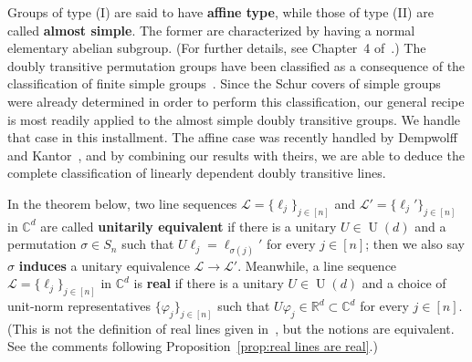 Groups of type (I) are said to have \textbf{affine type}, while those of type (II) are called \textbf{almost simple}.
The former are characterized by having a normal elementary abelian subgroup.
(For further details, see Chapter~4 of~\cite{DixonMortimer:96}.)
The doubly transitive permutation groups have been classified as a consequence of the classification of finite simple groups~\cite{Cameron:81}.
Since the Schur covers of simple groups were already determined in order to perform this classification, our general recipe is most readily applied to the almost simple doubly transitive groups.
We handle that case in this installment.
The affine case was recently handled by Dempwolff and Kantor~\cite{DempwolffK:23}, and by combining our results with theirs, we are able to deduce the complete classification of linearly dependent doubly transitive lines.

In the theorem below, two line sequences $\mathscr{L} = \{ \ell_j \}_{j\in [n]}$ and $\mathscr{L}' = \{ \ell_j' \}_{j\in [n]}$ in $\mathbb{C}^d$ are called \textbf{unitarily equivalent} if there is a unitary $U \in \operatorname{U}(d)$ and a permutation $\sigma \in S_n$ such that $U \ell_j = \ell_{\sigma(j)}'$ for every $j \in [n]$; then we also say $\sigma$ \textbf{induces} a unitary equivalence $\mathscr{L} \to \mathscr{L}'$.
Meanwhile, a line sequence $\mathscr{L} = \{ \ell_j \}_{j\in [n]}$ in $\mathbb{C}^d$ is \textbf{real} if there is a unitary $U \in \operatorname{U}(d)$ and a choice of unit-norm representatives $\{ \varphi_j \}_{j\in [n]}$ such that $U \varphi_j \in \mathbb{R}^d \subset \mathbb{C}^d$ for every $j \in [n]$.
(This is not the definition of real lines given in~\cite{IversonM:18}, but the notions are equivalent.
See the comments following Proposition~\ref{prop:real lines are real}.)

